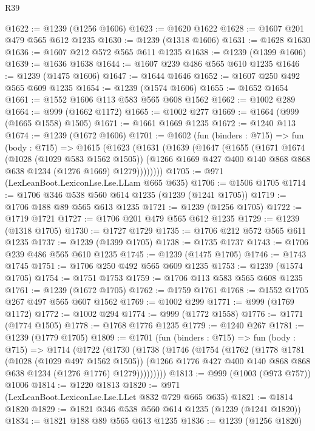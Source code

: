 \begin{lexlean}{R39}
\begin{coremodule}
@1622 := @1239 (@1256 @1606)
@1623 := @1620 @1622
@1628 := @1607 @201 @479 @565 @612 @1235
@1630 := @1239 (@1318 @1606)
@1631 := @1628 @1630
@1636 := @1607 @212 @572 @565 @611 @1235
@1638 := @1239 (@1399 @1606)
@1639 := @1636 @1638
@1644 := @1607 @239 @486 @565 @610 @1235
@1646 := @1239 (@1475 @1606)
@1647 := @1644 @1646
@1652 := @1607 @250 @492 @565 @609 @1235
@1654 := @1239 (@1574 @1606)
@1655 := @1652 @1654
@1661 := @1552 @1606 @113 @583 @565 @608 @1562
@1662 := @1002 @289
@1664 := @999 (@1662 @1172)
@1665 := @1002 @277
@1669 := @1664 (@999 (@1665 @1558) @1505)
@1671 := @1661 @1669 @1235
@1672 := @1240 @113
@1674 := @1239 (@1672 @1606)
@1701 := @1602
    (fun (binders : @715) =>
    fun (body : @715) =>
    @1615
      (@1623
        (@1631
          (@1639
            (@1647
              (@1655
                (@1671
                  @1674
                  (@1028 (@1029 @583 @1562 @1505))
                  (@1266 @1669 @427 @400 @140 @868 @868 @638 @1234 (@1276 @1669) @1279))))))))
@1705 := @971 (LexLeanBoot.LexiconLse.Lse.LLam @665 @635)
@1706 := @1506 @1705
@1714 := @1706 @346 @538 @560 @614 @1235 (@1239 (@1241 @1705))
@1719 := @1706 @188 @89 @565 @613 @1235
@1721 := @1239 (@1256 @1705)
@1722 := @1719 @1721
@1727 := @1706 @201 @479 @565 @612 @1235
@1729 := @1239 (@1318 @1705)
@1730 := @1727 @1729
@1735 := @1706 @212 @572 @565 @611 @1235
@1737 := @1239 (@1399 @1705)
@1738 := @1735 @1737
@1743 := @1706 @239 @486 @565 @610 @1235
@1745 := @1239 (@1475 @1705)
@1746 := @1743 @1745
@1751 := @1706 @250 @492 @565 @609 @1235
@1753 := @1239 (@1574 @1705)
@1754 := @1751 @1753
@1759 := @1706 @113 @583 @565 @608 @1235
@1761 := @1239 (@1672 @1705)
@1762 := @1759 @1761
@1768 := @1552 @1705 @267 @497 @565 @607 @1562
@1769 := @1002 @299
@1771 := @999 (@1769 @1172)
@1772 := @1002 @294
@1774 := @999 (@1772 @1558)
@1776 := @1771 (@1774 @1505)
@1778 := @1768 @1776 @1235
@1779 := @1240 @267
@1781 := @1239 (@1779 @1705)
@1809 := @1701
    (fun (binders : @715) =>
    fun (body : @715) =>
    @1714
      (@1722
        (@1730
          (@1738
            (@1746
              (@1754
                (@1762
                  (@1778
                    @1781
                    (@1028 (@1029 @497 @1562 @1505))
                    (@1266 @1776 @427 @400 @140 @868 @868 @638 @1234 (@1276 @1776) @1279)))))))))
@1813 := @999 (@1003 (@973 @757)) @1006
@1814 := @1220 @1813
@1820 := @971 (LexLeanBoot.LexiconLse.Lse.LLet @832 @729 @665 @635)
@1821 := @1814 @1820
@1829 := @1821 @346 @538 @560 @614 @1235 (@1239 (@1241 @1820))
@1834 := @1821 @188 @89 @565 @613 @1235
@1836 := @1239 (@1256 @1820)

\end{coremodule}
\end{lexlean}
